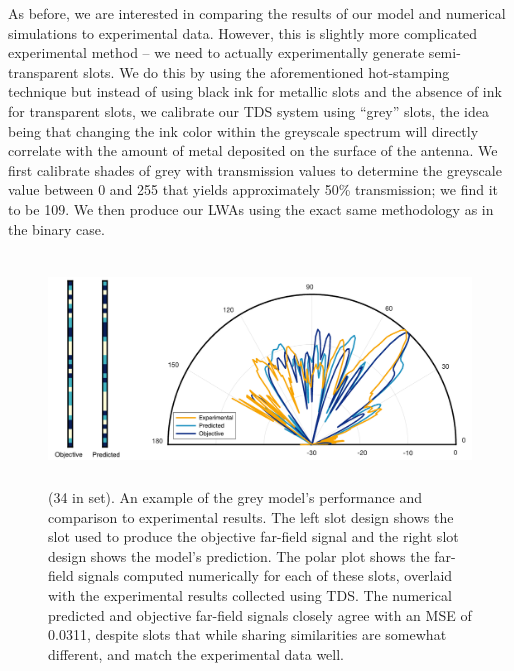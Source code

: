 \documentclass[11pt]{article}
\begin{document}
\noindent As before, we are interested in comparing the results of our model and numerical simulations to experimental data. However, this is slightly more complicated experimental method -- we need to actually experimentally generate semi-transparent slots. We do this by using the aforementioned hot-stamping technique but instead of using black ink for metallic slots and the absence of ink for transparent slots, we calibrate our TDS system using ``grey'' slots, the idea being that changing the ink color within the greyscale spectrum will directly correlate with the amount of metal deposited on the surface of the antenna. We first calibrate shades of grey with transmission values to determine the greyscale value between 0 and 255 that yields approximately 50\% transmission; we find it to be 109. We then produce our LWAs using the exact same methodology as in the binary case.

\begin{figure}[H]
	\centering
	\includegraphics[height=2.4in]{figures/greyexperiment}
		\caption{(34 in set). An example of the grey model's performance and comparison to experimental results. The left slot design shows the slot used to produce the objective far-field signal and the right slot design shows the model's prediction. The polar plot shows the far-field signals computed numerically for each of these slots, overlaid with the experimental results collected using TDS. The numerical predicted and objective far-field signals closely agree with an MSE of 0.0311, despite slots that while sharing similarities are somewhat different, and match the experimental data well.}
\end{figure}
\end{document}
